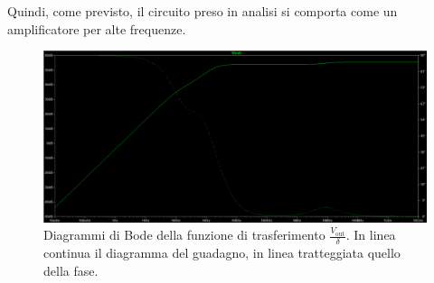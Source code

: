 Quindi, come previsto, il circuito preso in analisi si comporta come un amplificatore per alte frequenze.
\begin{figure}[h!]
    \centering
    \includegraphics[width=1\linewidth]{img/bode_preamp.png}
    \caption{Diagrammi di Bode della funzione di trasferimento $\frac{V_\text{out}}{\delta}$. In linea continua il diagramma del guadagno, in linea
    tratteggiata quello della fase.}
    \label{fig:bode_preamp}
\end{figure}
